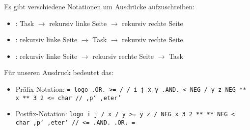 Es gibt verschiedene Notationen um Ausdrücke aufzuschreiben:
\begin{itemize}
	\item {}: Task $\to$ rekursiv linke Seite $\to$ rekursiv rechte Seite
	\item {}: rekursiv linke Seite $\to$ Task $\to$ rekursiv rechte Seite
	\item {}: rekursiv linke Seite $\to$ rekursiv rechte Seite $\to$ Task
\end{itemize}

Für unseren Ausdruck bedeutet das:
\begin{itemize}
	\item Präfix-Notation: \texttt{= logo .OR. >= / / i j x y .AND. < NEG / y z NEG ** x ** 3 2 <= char // ‚p‘ ‚eter‘}
	\item Postfix-Notation: \texttt{logo i j / x / y >= y z / NEG x 3 2 ** ** NEG < char ‚p‘ ‚eter‘ // <= .AND. .OR. =}
\end{itemize}